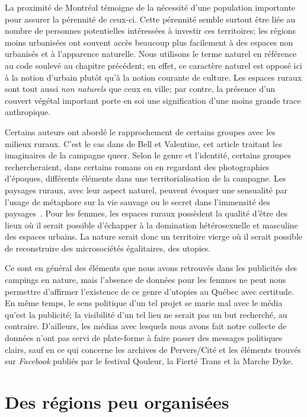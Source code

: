 La proximité de Montréal témoigne de la nécessité d'une population importante pour assurer la pérennité de ceux-ci.
Cette pérennité semble surtout être liée au nombre de personnes potentielles intéressées à investir ces territoires; les régions moins urbanisées ont souvent accès beaucoup plus facilement à des espaces non urbanisés et à l'apparence naturelle.
Nous utilisons le terme naturel en référence au code soulevé au chapitre précédent; en effet, ce caractère naturel est opposé ici à la notion d'urbain plutôt qu'à la notion courante de culture.
Les espaces ruraux sont tout aussi \emph{non naturels} que ceux en ville; par contre, la présence d'un couvert végétal important porte en soi une signification d'une moins grande trace anthropique.

Certains auteurs ont abordé le rapprochement de certains groupes \lgbt{} avec les milieux ruraux.
C'est le cas dans  de Bell et Valentine, cet article traitant les imaginaires de la campagne queer.
Selon le genre et l'identité, certains groupes rechercheraient, dans certains romans ou en regardant des photographies d'époques, différents éléments dans une territorialisation de la campagne.
Les paysages ruraux, avec leur aspect naturel, peuvent évoquer une sensualité par l'usage de métaphore sur la vie sauvage ou le secret dans l'immensité des paysages~\citep[114]{Bell1995a}.
Pour les femmes, les espaces ruraux possèdent la qualité d'être des lieux où il serait possible d'échapper à la domination hétérosexuelle et masculine des espaces urbains.
La nature serait donc un territoire vierge où il serait possible de reconstruire des microsociétés égalitaires, des utopies.

Ce sont en général des éléments que nous avons retrouvés dans les publicités des campings en nature, mais l'absence de données pour les femmes ne peut nous permettre d'affirmer l'existence de ce genre d'utopies au Québec avec certitude.
En même temps, le sens politique d'un tel projet se marie mal avec le média qu'est la publicité; la visibilité d'un tel lieu ne serait pas un but recherché, au contraire.
D'ailleurs, les médias \lgbt{} avec lesquels nous avons fait notre collecte de données n'ont pas servi de plate-forme à faire passer des messages politiques clairs, sauf en ce qui concerne les archives de Pervers/Cité et les éléments trouvés sur \emph{Facebook} publiés par le festival Qouleur, la Fierté Trans et la Marche Dyke.

\section{Des régions peu organisées}
\label{sec:des_regions_peu_organisees}

